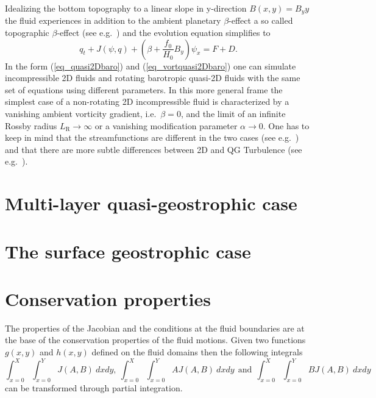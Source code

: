 Idealizing the bottom topography to a linear slope in y-direction 
$B(x,y) = B_{y} y$ the fluid experiences in addition to the ambient
planetary $\beta$-effect a so called topographic $\beta$-effect 
(see e.g.\ \cite{vanheist1994}) and the evolution equation simplifies to
\begin{equation} \label{eq_qbarotopobeta} 
  q_{t} + J(\psi,q) + \left(\beta + \frac{f_{0}}{H_{0}} B_{y} \right) \psi_{x} 
   = F + D.
\end{equation}
In the form (\ref{eq_quasi2Dbaro}) and (\ref{eq_vortquasi2Dbaro}) 
one can simulate incompressible 2D fluids and rotating barotropic 
quasi-2D fluids with the same set of equations using different parameters. 
In this more general frame the simplest case of a non-rotating
2D incompressible fluid is characterized by a vanishing 
ambient vorticity gradient, i.e.\ $\beta = 0$, and the limit of
an infinite Rossby radius $L_{\mathrm{R}} \longrightarrow \infty$
or a vanishing modification parameter $\alpha \longrightarrow 0$.
One has to keep in mind that the streamfunctions are different in 
the two cases (see e.g.\ \cite{johnstonandliu2004}) and that there 
are more subtle differences between 2D and QG Turbulence 
(see e.g.\ \cite{tungandorlando2003}). 
%
\section{Multi-layer quasi-geostrophic case} \label{sec_multilayerqg}
%
%
\section{The surface geostrophic case} \label{sec_sqg}
%
%
\section{Conservation properties} \label{sec_conprops}
%
The properties of the Jacobian and the conditions at the fluid boundaries
are at the base of the conservation properties of the fluid motions.
Given two functions $g(x,y)$ and $h(x,y)$ defined on the fluid domains
then the following integrals
\begin{equation} \label{eq_intjacobian01}
  \int_{x=0}^{X} \int_{x=0}^{Y} J(A,B) \ dxdy 
  , \
  \int_{x=0}^{X} \int_{x=0}^{Y} A J(A,B) \ dxdy 
   \ \ \mbox{and} \ \    
  \int_{x=0}^{X} \int_{x=0}^{Y} B J(A,B) \ dxdy 
\end{equation}
can be transformed through partial integration.



